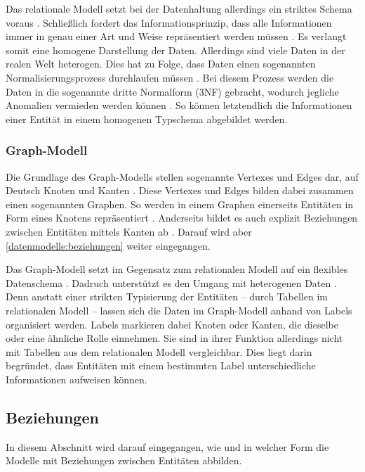 Das relationale Modell setzt bei der Datenhaltung allerdings ein striktes Schema voraus \cite{rdbms_book}. Schließlich fordert das Informationsprinzip, dass alle Informationen immer in genau einer Art und Weise repräsentiert werden müssen \cite{rdbms_history}. Es verlangt somit eine homogene Darstellung der Daten. Allerdings sind viele Daten in der realen Welt heterogen. Dies hat zu Folge, dass Daten einen sogenannten Normalisierungsprozess durchlaufen müssen \cite{rdbms_book}. Bei diesem Prozess werden die Daten in die sogenannte dritte Normalform (3NF) gebracht, wodurch jegliche Anomalien vermieden werden können \cite{rdbms_book}. So können letztendlich die Informationen einer Entität in einem homogenen Typschema abgebildet werden. 

\subsubsection{Graph-Modell}
Die Grundlage des Graph-Modells stellen sogenannte Vertexes und Edges dar, auf Deutsch Knoten und Kanten \cite{gdbms}. Diese Vertexes und Edges bilden dabei zusammen einen sogenannten Graphen. So werden in einem Graphen einerseits Entitäten in Form eines Knotens repräsentiert \cite{gdbms}. Anderseits bildet es auch explizit Beziehungen zwischen Entitäten mittels Kanten ab \cite{gdbms}. Darauf wird aber \autoref{datenmodelle:beziehungen}  weiter eingegangen.

Das Graph-Modell setzt im Gegensatz zum relationalen Modell auf ein flexibles Datenschema \cite{gdbms}. Dadruch unterstützt es den Umgang mit heterogenen Daten \cite{gdbms}. Denn anstatt einer strikten Typisierung der Entitäten -- durch Tabellen im relationalen Modell -- lassen sich die Daten im Graph-Modell anhand von Labels organisiert werden. Labels markieren dabei Knoten oder Kanten, die dieselbe oder eine ähnliche Rolle einnehmen. Sie sind in ihrer Funktion allerdings nicht mit Tabellen aus dem relationalen Modell vergleichbar. Dies liegt darin begründet, dass Entitäten mit einem bestimmten Label unterschiedliche Informationen aufweisen können. 

\subsection{Beziehungen}
\label{datenmodelle:beziehungen}
In diesem Abschnitt wird darauf eingegangen, wie und in welcher Form die Modelle mit Beziehungen zwischen Entitäten abbilden. 

